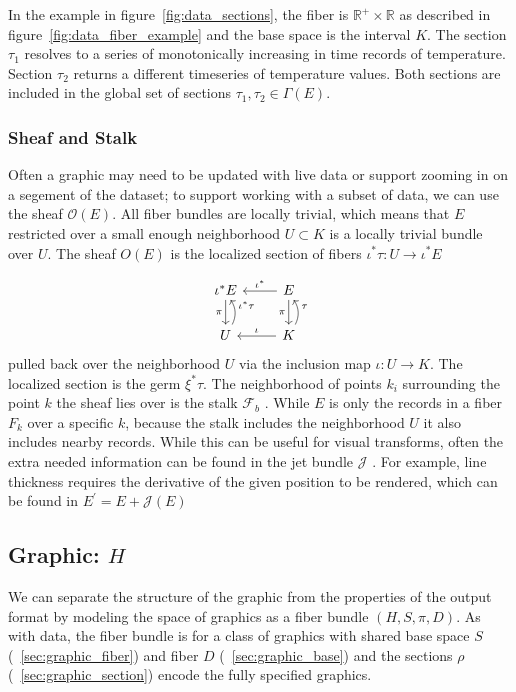 \documentclass[../main.tex]{subfiles}
\begin{document}
In the example in figure~\ref{fig:data_sections}, the fiber is $\mathbb{R}^+\times \mathbb{R}$ as described in figure~\ref{fig:data_fiber_example} and the base space is the interval $K$. The section $\tau_1$ resolves to a series of monotonically increasing in time records of temperature. Section $\tau_2$ returns a different timeseries of temperature values. Both sections are included in the global set of sections $\tau_1, \tau_2 \in \Gamma(E)$.

\subsubsection{Sheaf and Stalk}
\label{sec:data_sheaf_stalk}
Often a graphic may need to be updated with live data or support zooming in on a segement of the dataset; to support working with a subset of data, we can use the sheaf $\mathcal{O}(E)$. All fiber bundles are locally trivial, which means that $E$ restricted over a small enough neighborhood $U \subset K$ is a locally trivial bundle over $U$\cite{LocallyTrivialFibre}. The sheaf $O(E)$ is the localized section of fibers $\iota^*\tau: U \rightarrow \iota^*E$

\begin{equation}
    \label{eq:sheaf}
    \begin{tikzcd}
        \iota^*E \arrow[d, "\pi"']           & E \arrow[d, "\pi"'] \arrow[l, "\iota^*"']         \\
        U \arrow[u, "\iota^*\tau"', bend right] & K \arrow[u, "\tau"', bend right] \arrow[l, "\iota"']
        \end{tikzcd}
\end{equation}
pulled back over the neighborhood $U$ via the inclusion map $\iota: U \rightarrow K$. The localized section is the germ $\xi^*\tau$. The neighborhood of points $k_i$ surrounding the point $k$ the sheaf lies over is the stalk $\mathcal{F}_b$ \cite{StalkSheaf2019,spanier1989algebraic}. While $E$ is only the records in a fiber $F_k$ over a specific $k$, because the stalk includes the neighborhood $U$ it also includes nearby records. While this can be useful for visual transforms, often the extra needed information can be found in the jet bundle $\mathcal{J}$ \cite{JetBundle2020,musilovaCalculusVariationsJet2016}. For example, line thickness requires the derivative of the given position to be rendered, which can be found in $E^\prime=E+\mathcal{J}(E)$


\subsection{Graphic: $H$}
\label{sec:graphic}  
We can separate the structure of the graphic from the properties of the output format by modeling the space of graphics as a fiber bundle  $(H, S, \pi, D)$. As with data, the fiber bundle is for a class of graphics with shared base space $S$ (~\ref{sec:graphic_fiber}) and fiber $D$ (~\ref{sec:graphic_base}) and the sections $\rho$ (~\ref{sec:graphic_section}) encode the fully specified graphics. 
\end{document}
